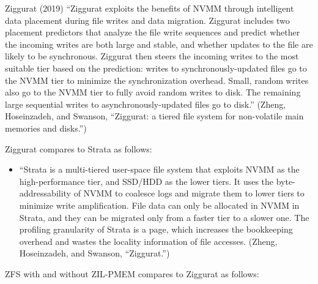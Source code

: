 \documentclass[12pt,a4paper,twoside,draft]{book}
\begin{document}
Ziggurat (2019) “Ziggurat exploits the benefits of NVMM through intelligent data placement during file writes and data migration. Ziggurat includes two placement predictors that analyze the file write sequences and predict whether the incoming writes are both large and stable, and whether updates to the file are likely to be synchronous. Ziggurat then steers the incoming writes to the most suitable tier based on the prediction: writes to synchronously-updated files go to the NVMM tier to minimize the synchronization overhead. Small, random writes also go to the NVMM tier to fully avoid random writes to disk. The remaining large sequential writes to asynchronously-updated files go to disk.” (Zheng, Hoseinzadeh, and Swanson, “Ziggurat: a tiered file system for non-volatile main memories and disks.”)

Ziggurat compares to Strata as follows:
\begin{itemize}
    \item “Strata is a multi-tiered user-space file system that exploits NVMM as the high-performance tier, and SSD/HDD as the lower tiers. It uses the byte-addressability of NVMM to coalesce logs and migrate them to lower tiers to minimize write amplification. File data can only be allocated in NVMM in Strata, and they can be migrated only from a faster tier to a slower one. The profiling granularity of Strata is a page, which increases the bookkeeping overhead and wastes the locality information of file accesses. (Zheng, Hoseinzadeh, and Swanson, “Ziggurat.”)
\end{itemize}
ZFS with and without ZIL-PMEM compares to Ziggurat as follows:
\end{document}
